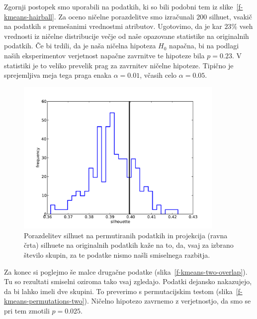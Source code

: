 Zgornji postopek smo uporabili na podatkih, ki so bili podobni tem iz
slike~\ref{f-kmeans-hairball}. Za oceno ničelne porazdelitve smo
izračunali $200$ silhuet, vsakič na podatkih s premešanimi vrednostmi
atributov. Ugotovimo, da je kar $23\%$ vseh vrednosti iz ničelne
distribucije večje od naše opazovane statistike na originalnih
podatkih. Če bi trdili, da je naša ničelna hipoteza $H_0$ napačna, bi
na podlagi naših eksperimentov verjetnost napačne zavrnitve te
hipoteze bila $p=0.23$. V statistiki je to veliko prevelik prag za
zavrnitev ničelne hipoteze. Tipično je sprejemljiva meja tega praga
enaka $\alpha=0.01$, včasih celo $\alpha=0.05$. 

\begin{figure}[htbp]
\begin{center}
  \includegraphics[width=10cm]{slike/kmeans-permutations.pdf}
\caption{Porazdelitev silhuet na permutiranih podatkih in projekcija
  (ravna črta) silhuete na originalnih podatkih kaže na to, da, vsaj
  za izbrano število skupin, za te podatke nismo našli smiselnega razbitja.}
\label{f-kmeans-permutations}
\end{center}
\end{figure}

Za konec si poglejmo še malce drugačne podatke
(slika~\ref{f-kmeans-two-overlap}). Tu so rezultati smiselni oziroma
tako vsaj zgledajo. Podatki dejansko nakazujejo, da bi lahko imeli
dve skupini. To preverimo s permutacijskim testom
(slika~\ref{f-kmeans-permutations-two}). Ničelno hipotezo zavrnemo z
verjetnostjo, da smo se pri tem zmotili $p=0.025$.


